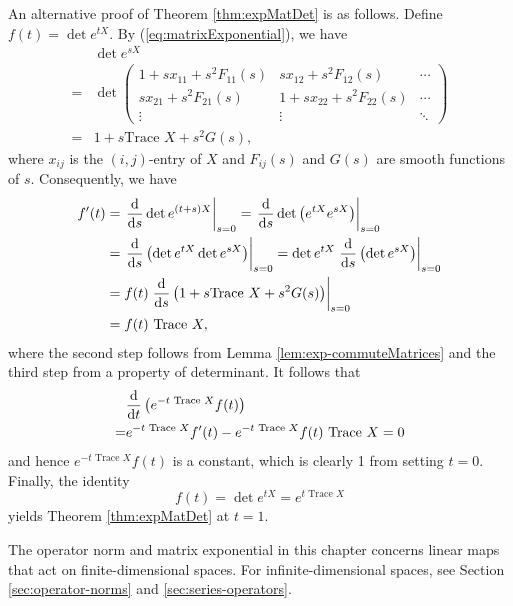 \begin{rem}
  An alternative proof of Theorem \ref{thm:expMatDet} is as follows. 
  Define $f(t) = \det e^{tX}$.
  By (\ref{eq:matrixExponential}), we have
  \begin{align*}
    &\det e^{sX} \\
    =& \det
    \begin{pmatrix}
      1 + s x_{11} + s^2 F_{11}(s)  & s x_{12} + s^2 F_{12}(s) &
      \cdots
      \\
      s x_{21} + s^2 F_{21}(s)  & 1 + s x_{22} + s^2 F_{22}(s) &
      \cdots
      \\
      \vdots & \vdots & \ddots 
    \end{pmatrix}
    \\
    =& 1 + s \text{Trace } X + s^2 G(s),
  \end{align*}
  where $x_{ij}$ is the $(i,j)$-entry of $X$
  and $F_{ij}(s)$ and $G(s)$ are smooth functions of $s$.
  Consequently, we have
  \begin{align*}
    f'(t)
    &= \left. \frac{\mathrm{d} }{\mathrm{d} s} \det e^{(t+s)X}\right|_{s=0}
      = \left. \frac{\mathrm{d} }{\mathrm{d} s}
      \det \left(e^{tX}e^{sX}\right)\right|_{s=0}
    \\
    &= \left. \frac{\mathrm{d} }{\mathrm{d} s}
      \left(\det e^{tX} \det e^{sX}\right)\right|_{s=0}
      = \det e^{tX} \left. \frac{\mathrm{d} }{\mathrm{d} s}
      \left(\det e^{sX}\right)\right|_{s=0}
    \\
    &= f(t) \left. \frac{\mathrm{d} }{\mathrm{d} s} \left(
      1 + s \text{Trace } X + s^2 G(s)
      \right)\right|_{s=0}
    \\
    &= f(t) \text{ Trace } X,
  \end{align*}
  where the second step follows from Lemma
  \ref{lem:exp-commuteMatrices} and 
  the third step from a property of determinant.
  It follows that  
  \begin{align*}
    &\frac{\mathrm{d}}{\mathrm{d} t} \left( e^{- t \text{ Trace } X}f(t)\right)
    \\
    =& e^{- t \text{ Trace } X}f'(t) -
    e^{- t \text{ Trace } X} f(t) \text{ Trace } X  = 0
  \end{align*}
  and hence $e^{- t \text{ Trace } X}f(t)$ is a constant,
  which is clearly 1 from setting $t=0$.
  Finally, the identity
  \begin{displaymath}
    f(t) = \det e^{tX} = e^{t \text{ Trace } X}
  \end{displaymath}
  yields Theorem \ref{thm:expMatDet} at $t=1$.
\end{rem}

\begin{rem}
  The operator norm and matrix exponential in this chapter
  concerns linear maps that act on finite-dimensional spaces.
  For infinite-dimensional spaces,
  see Section \ref{sec:operator-norms} and \ref{sec:series-operators}.
\end{rem}




